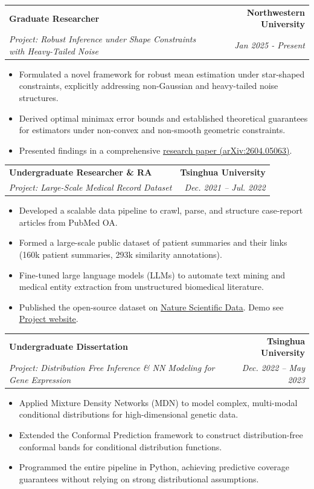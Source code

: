 \documentclass[letterpaper,11pt]{article}
\makeatletter
\newcommand{\resumeItem}[1]{
  \item\small{
    {#1 \vspace{-2pt}}
  }
}
\newcommand{\resumeSubheading}[4]{
  \vspace{-2pt}\item
    \begin{tabular*}{1.0\textwidth}[t]{l@{\extracolsep{\fill}}r}
      \textbf{#1} & \textbf{\small #2} \\
      \textit{\small#3} & \textit{\small #4} \\
    \end{tabular*}\vspace{-7pt}
}
\newcommand{\resumeItemListStart}{\begin{itemize}}
\newcommand{\resumeItemListEnd}{\end{itemize}\vspace{-5pt}}
\makeatother
\begin{document}
    \resumeSubheading
      {Graduate Researcher}{Northwestern University}
      {Project: Robust Inference under Shape Constraints with Heavy-Tailed Noise}{Jan 2025 - Present}
      \resumeItemListStart
        \resumeItem{Formulated a novel framework for robust mean estimation under star-shaped constraints, explicitly addressing non-Gaussian and heavy-tailed noise structures.}
        \resumeItem{Derived optimal minimax error bounds and established theoretical guarantees for estimators under non-convex and non-smooth geometric constraints.}
        \resumeItem{Presented findings in a comprehensive \href{https://arxiv.org/abs/2604.05063}{research paper (\underline{arXiv:2604.05063})}.}
      \resumeItemListEnd

    \resumeSubheading
      {Undergraduate Researcher \& RA}{Tsinghua University}
      {Project: Large-Scale Medical Record Dataset}{Dec. 2021 – Jul. 2022}
      \resumeItemListStart
        \resumeItem{Developed a scalable data pipeline to crawl, parse, and structure case-report articles from PubMed OA.}
        \resumeItem{Formed a large-scale public dataset of patient summaries and their links (160k patient summaries, 293k similarity annotations).}
        \resumeItem{Fine-tuned large language models (LLMs) to automate text mining and medical entity extraction from unstructured biomedical literature.}
        \resumeItem{Published the open-source dataset on \href{https://www.nature.com/articles/s41597-023-02814-8}{\underline{Nature Scientific Data}}. Demo see \href{https://pmc-patients.github.io/}{\underline{Project website}}.}
      \resumeItemListEnd
    \resumeSubheading
      {Undergraduate Dissertation}{Tsinghua University}
      {Project: Distribution Free Inference \& NN Modeling for Gene Expression}{Dec. 2022 – May 2023}
      \resumeItemListStart
        \resumeItem{Applied Mixture Density Networks (MDN) to model complex, multi-modal conditional distributions for high-dimensional genetic data.}
        \resumeItem{Extended the Conformal Prediction framework to construct distribution-free conformal bands for conditional distribution functions.}
        \resumeItem{Programmed the entire pipeline in Python, achieving predictive coverage guarantees without relying on strong distributional assumptions.}
      \resumeItemListEnd

\end{document}
